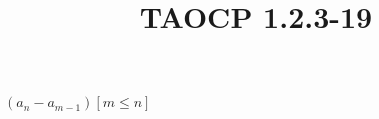 \documentclass{article}
\title{TAOCP 1.2.3\mbox{-}19}
\begin{document}
\maketitle

\( (a_{n} - a_{m-1})[m \leq n] \)
\end{document}
